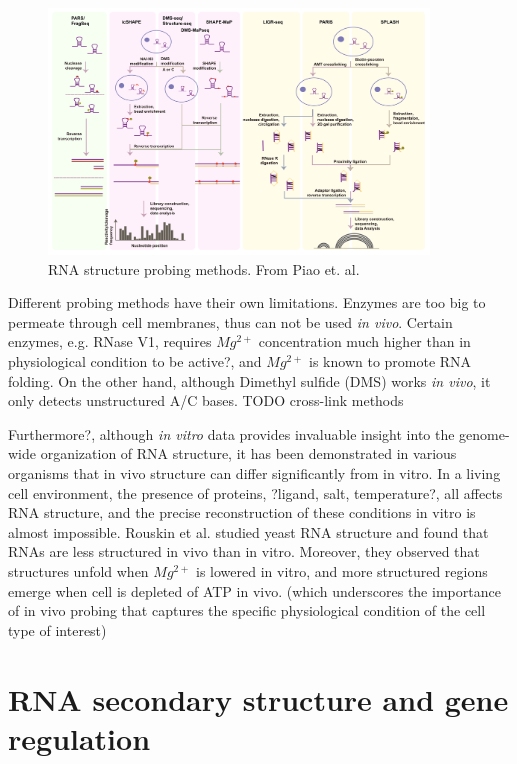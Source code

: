 \documentclass{proposal}
\begin{document}
\begin{figure}[h!]
    \centering
    \includegraphics[width=0.9\textwidth]{probing_methods.png}
    \caption{RNA structure probing methods. From Piao et. al\cite{piao2017rna}.}
    \label{fig:probing_methods}
    \centering
\end{figure}



Different probing methods have their own limitations.
Enzymes are too big to ﻿permeate through cell membranes, thus can not be used \textit{in vivo}.
Certain enzymes, e.g. ﻿RNase V1, requires $Mg^{2+}$ concentration much higher than
in physiological condition to be active?, and $Mg^{2+}$ is known to promote RNA folding.
On the other hand, although ﻿Dimethyl sulfide (DMS) works \textit{in vivo},
it only detects unstructured A/C bases.
TODO cross-link methods


Furthermore?, although \textit{in vitro} data provides invaluable insight into the genome-wide organization of RNA structure,
it has been demonstrated in various organisms that in vivo structure can differ significantly from in vitro.
In a living cell environment, the presence of proteins,  ?ligand, salt, temperature?, all affects RNA structure,
and the precise reconstruction of these conditions in vitro is almost impossible.
﻿Rouskin et al.\cite{rouskin2014genome} studied yeast RNA structure and found that RNAs are less structured in vivo than in vitro.
Moreover, they observed that structures unfold when $Mg^{2+}$ is lowered in vitro,
and more structured regions emerge when cell is depleted of ATP in vivo.
(which underscores the importance of in vivo probing that captures the specific physiological condition of the cell type of interest)




\section{RNA secondary structure and gene regulation}
\end{document}
